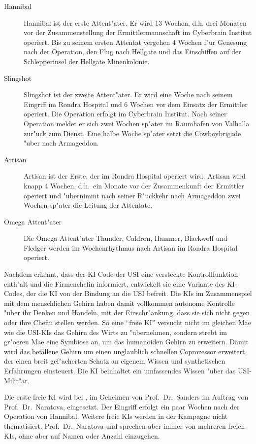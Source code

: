 \begin{description}
    \item[Hannibal] Hannibal ist der erste Attent"ater. Er wird 13 Wochen, d.h. drei Monaten vor der Zusammenstellung der 
        Ermittlermannschaft im Cyberbrain Institut operiert. Bis zu seinem ersten Attentat vergehen 4 Wochen f"ur Genesung nach der Operation, den Flug nach Hellgate und das Einschiffen auf der Schlepperinsel der Hellgate Minenkolonie.
    \item[Slingshot] Slingshot ist der zweite Attent"ater. Er wird eine Woche nach seinem Eingriff im Rondra Hospital und 6 Wochen vor dem 
        Einsatz der Ermittler operiert. Die Operation erfolgt im Cyberbrain Institut. Nach seiner Operation meldet er sich zwei Wochen sp"ater im Raumhafen von Valhalla zur"uck zum Dienst. Eine halbe Woche sp"ater setzt die Cowboybrigade "uber nach Armageddon.
    \item[Artisan] Artisan ist der Erste, der im Rondra Hospital operiert wird. Artisan wird knapp 4 Wochen, d.h.~ein Monate vor der Zusammenkunft der Ermittler operiert und "ubernimmt nach seiner R"uckkehr nach Armageddon zwei Wochen sp"ater die Leitung der Attentate.
    \item[Omega Attent"ater] Die Omega Attent"ater Thunder, Caldron, Hammer, Blackwolf und Fledger werden im Wochenrhythmus nach Artisan im 
        Rondra Hospital operiert.
\end{description}

Nachdem \ml{} erkennt, dass der KI-Code der USI eine versteckte Kontrollfunktion enth"alt und die Firmenchefin informiert, entwickelt sie eine Variante des KI-Codes, der die KI von der Bindung an die USI befreit. Die KIs im Zusammenspiel mit dem menschlichen Gehirn haben damit vollkommen autonome Kontrolle "uber ihr Denken und Handeln, mit der Einschr"ankung, dass sie sich nicht gegen \ml{} oder ihre Chefin stellen werden. So eine ``freie KI'' versucht nicht im gleichen Ma\3e wie die USI-KIs das Gehirn des Wirts zu "ubernehmen, sondern strebt im gr"o\3eren Ma\3e eine Symbiose an, um das humanoiden Gehirn zu erweitern. Damit wird das befallene Gehirn um einen unglaublich schnellen Coprozessor erweitert, der einen breit gef"acherten Schatz an eigenem Wissen und synthetischen Erfahrungen einsteuert. Die KI beinhaltet ein umfassendes Wissen "uber das USI-Milit"ar. 

Die erste freie KI wird bei \xl{}, im Geheimen von Prof.~Dr.~Sanders im Auftrag von Prof.~Dr.~Naratova, eingesetzt. Der Eingriff erfolgt ein paar Wochen nach der Operation von Hannibal. Weitere freie KIs werden in der Kampagne nicht thematisiert. Prof.~Dr.~Naratova und \ml{} sprechen aber immer von mehreren freien KIs, ohne aber auf Namen oder Anzahl einzugehen.
